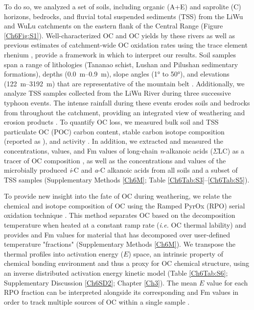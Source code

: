 To do so, we analyzed a set of soils, including organic (A+E) and saprolite (C) horizons, bedrocks, and fluvial total suspended sediments (TSS) from the LiWu and WuLu catchments on the eastern flank of the Central Range (Figure \ref{Ch6Fig:S1}). Well-characterized OC and OC yields by these rivers \citep{Hilton:2008fo,Hilton:2010cg,Hilton:2011jw,Hilton:2012dt} as well as previous estimates of catchment-wide OC oxidation rates using the trace element rhenium \citep{Hilton:2014dh}, provide a framework in which to interpret our results. Soil samples span a range of lithologies (Tananao schist, Lushan and Pilushan sedimentary formations), depths (\SIrange{0.0}{0.9}{m}), slope angles (\ang{1} to \ang{50}), and elevations (\SIrange{122}{3192}{m}) that are representative of the mountain belt \citep{Hilton:2013kq}. Additionally, we analyze TSS samples collected from the LiWu River during three successive typhoon events. The intense rainfall during these events erodes soils and bedrocks from throughout the catchment, providing an integrated view of weathering and erosion products \citep{Hilton:2010cg}. To quantify OC loss, we measured bulk soil and TSS particulate OC (POC) carbon content, stable carbon isotope composition (reported as ), and  activity \citep[reported as fraction modern (Fm) following][Table \ref{Ch6Tab:S1}--\ref{Ch6Tab:S2}]{Stuiver:1977uh}. In addition, we extracted and measured the concentrations,  values, and Fm values of long-chain \textit{n}-alkanoic acids ($\Sigma$LC) as a tracer of OC composition \citep{Eglinton:1967uz}, as well as the concentrations and  values of the microbially produced \textit{i}-C and \textit{a}-C alkanoic acids \citep{Bardgett:2007eb} from all soils and a subset of TSS samples (Supplementary Methods \ref{Ch6M}; Table \ref{Ch6Tab:S3}--\ref{Ch6Tab:S5}).

To provide new insight into the fate of OC during weathering, we relate the chemical and isotope composition of OC using the Ramped PyrOx (RPO) serial oxidation technique \citep{Rosenheim:2008ed,Rosenheim:2012kh}. This method separates OC based on the decomposition temperature when heated at a constant ramp rate (\textit{i.e.} OC thermal lability) and provides  and Fm values for material that has decomposed over user-defined temperature "fractions" (Supplementary Methods \ref{Ch6M}). We transpose the thermal profiles into activation energy ($E$) space, an intrinsic property of chemical bonding environment and thus a proxy for OC chemical structure, using an inverse distributed activation energy kinetic model (Table \ref{Ch6Tab:S6}; Supplementary Discussion \ref{Ch6SD2}; Chapter \ref{Ch3}). The mean $E$ value for each RPO fraction can be interpreted alongside its corresponding  and Fm values in order to track multiple sources of OC within a single sample \citep{Rosenheim:2008ed,Rosenheim:2012kh}.

